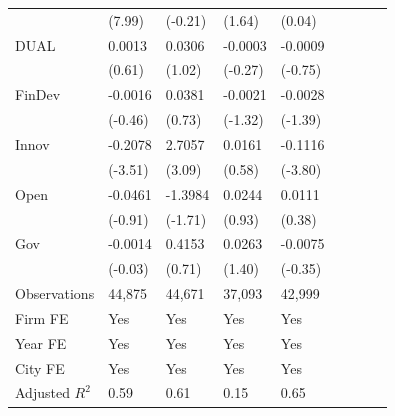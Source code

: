\begin{table}[htbp]
\begin{tabularx}{\textwidth}{lYYYYYYYY@{}}
                &   (7.99)         &  (-0.21)         &   (1.64)         &   (0.04)         \\
DUAL            &   0.0013         &   0.0306         &  -0.0003         &  -0.0009         \\
                &   (0.61)         &   (1.02)         &  (-0.27)         &  (-0.75)         \\
FinDev     &  -0.0016         &   0.0381         &  -0.0021         &  -0.0028         \\
                &  (-0.46)         &   (0.73)         &  (-1.32)         &  (-1.39)         \\
Innov      &  -0.2078\sym{***}&   2.7057\sym{***}&   0.0161         &  -0.1116\sym{***}\\
                &  (-3.51)         &   (3.09)         &   (0.58)         &  (-3.80)         \\
Open       &  -0.0461         &  -1.3984\sym{*}  &   0.0244         &   0.0111         \\
                &  (-0.91)         &  (-1.71)         &   (0.93)         &   (0.38)         \\
Gov        &  -0.0014         &   0.4153         &   0.0263         &  -0.0075         \\
                &  (-0.03)         &   (0.71)         &   (1.40)         &  (-0.35)         \\
\hline
Observations    &   44,875         &   44,671         &   37,093         &   42,999         \\
Firm FE         &      Yes         &      Yes         &      Yes         &      Yes         \\
Year FE         &      Yes         &      Yes         &      Yes         &      Yes         \\
City FE         &      Yes         &      Yes         &      Yes         &      Yes         \\
Adjusted $ R^2$ &     0.59         &     0.61         &     0.15         &     0.65         \\
\bottomrule
\end{tabularx}
\end{table}
